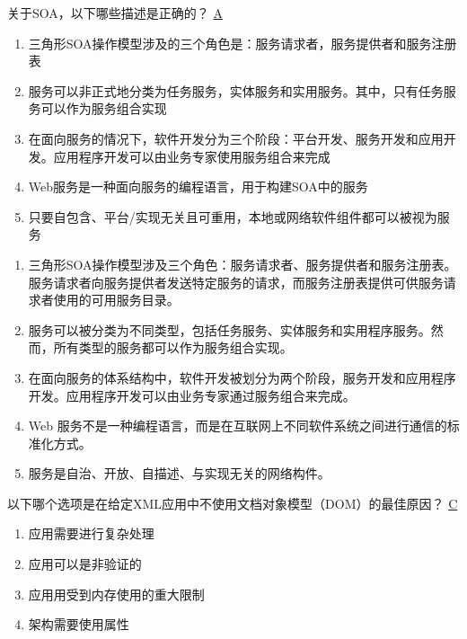 \begin{problem}
关于SOA，以下哪些描述是正确的？
\uline{A}
\begin{enumerate}[label=\Alph*.]
    \item 三角形SOA操作模型涉及的三个角色是：服务请求者，服务提供者和服务注册表
    \item 服务可以非正式地分类为任务服务，实体服务和实用服务。其中，只有任务服务可以作为服务组合实现
    \item 在面向服务的情况下，软件开发分为三个阶段：平台开发、服务开发和应用开发。应用程序开发可以由业务专家使用服务组合来完成
    \item Web服务是一种面向服务的编程语言，用于构建SOA中的服务
    \item 只要自包含、平台/实现无关且可重用，本地或网络软件组件都可以被视为服务
\end{enumerate}
\end{problem}

\begin{solution}
\begin{enumerate}[label=\Alph*.]
    \item 三角形SOA操作模型涉及三个角色：服务请求者、服务提供者和服务注册表。服务请求者向服务提供者发送特定服务的请求，而服务注册表提供可供服务请求者使用的可用服务目录。
    \item 服务可以被分类为不同类型，包括任务服务、实体服务和实用程序服务。然而，所有类型的服务都可以作为服务组合实现。
    \item 在面向服务的体系结构中，软件开发被划分为两个阶段，服务开发和应用程序开发。应用程序开发可以由业务专家通过服务组合来完成。
    \item Web 服务不是一种编程语言，而是在互联网上不同软件系统之间进行通信的标准化方式。
    \item 服务是自治、开放、自描述、与实现无关的网络构件。
\end{enumerate}
\end{solution}

\begin{problem}
以下哪个选项是在给定XML应用中不使用文档对象模型（DOM）的最佳原因？
\uline{C}
\vspace{-0.8em}
\begin{multicols}{2}
    \begin{enumerate}[label=\Alph*.]
        \item 应用需要进行复杂处理
        \item 应用可以是非验证的
        \item 应用用受到内存使用的重大限制
        \item 架构需要使用属性
    \end{enumerate}
\end{multicols}
\vspace{-1em}
\end{problem}

